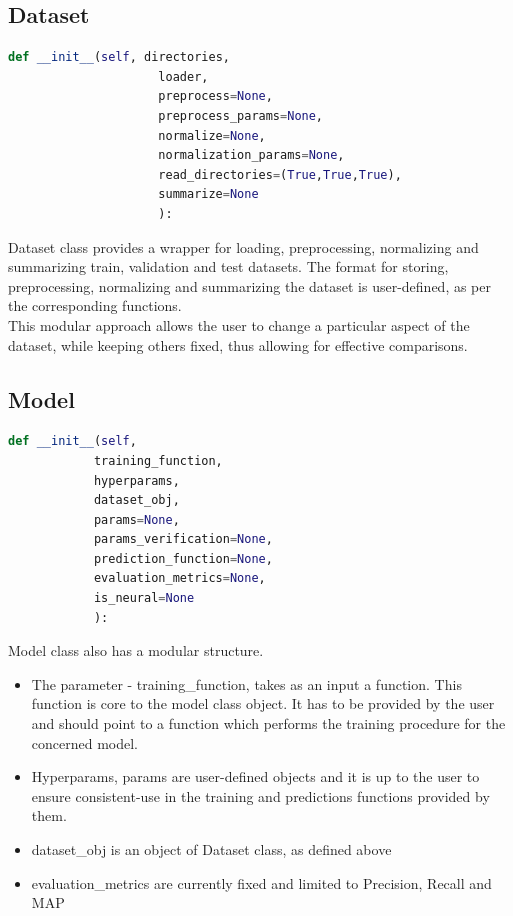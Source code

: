 \documentclass[10pt]{scrartcl}
\begin{document}
\subsection{Dataset}
\begin{lstlisting}[language=Python, caption=Dataset initializer]
def __init__(self, directories,
                     loader, 
                     preprocess=None,
                     preprocess_params=None,
                     normalize=None,
                     normalization_params=None,
                     read_directories=(True,True,True),
                     summarize=None
                     ):
\end{lstlisting}
Dataset class provides a wrapper for loading, preprocessing, normalizing and summarizing train, validation and test datasets. The format for storing, preprocessing, normalizing and summarizing the dataset is user-defined, as per the corresponding functions.\\
This modular approach allows the user to change a particular aspect of the dataset, while keeping others fixed, thus allowing for effective comparisons.
\subsection{Model}
\begin{lstlisting}[language=Python, caption=Model initializer]
def __init__(self, 
            training_function,
            hyperparams,
            dataset_obj,
            params=None,
            params_verification=None,
            prediction_function=None,
            evaluation_metrics=None,
            is_neural=None
            ):
\end{lstlisting}
Model class also has a modular structure. 
\begin{itemize}
    \item The parameter - training\_function, takes as an input a function. This function is core to the model class object. It has to be provided by the user and should point to a function which performs the training procedure for the concerned model.
    \item  Hyperparams, params are user-defined objects and it is up to the user to ensure consistent-use in the training and predictions functions provided by them.
    \item dataset\_obj is an object of Dataset class, as defined above
    \item evaluation\_metrics are currently fixed and limited to Precision, Recall and MAP
\end{itemize}
\end{document}
